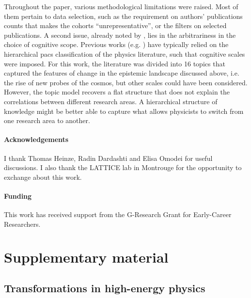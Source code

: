 \documentclass{article}
\begin{document}
Throughout the paper, various methodological limitations were raised. Most of them pertain to data selection, such as the requirement on authors' publications counts that makes the cohorts ``unrepresentative'', or the filters on selected publications. A second issue, already noted by \citet{Gieryn1978}, lies in the arbitrariness in the choice of cognitive scope. Previous works (e.g. \citealt{Tripodi2020,Aleta2019,Battiston2019,Jia2017}) have typically relied on the hierarchical \gls{pacs} classification of the physics literature, such that cognitive scales were imposed. For this work, the literature was divided into 16 topics that captured the features of change in the epistemic landscape discussed above, i.e. the rise of new probes of the cosmos, but other scales could have been considered. However, the topic model recovers a flat structure that does not explain the correlations between different research areas. A hierarchical structure of knowledge might be better able to capture what allows physicists to switch from one research area to another. %


\paragraph{Acknowledgements}{I thank Thomas Heinze, Radin Dardashti and Elisa Omodei for useful discussions. I also thank the LATTICE lab in Montrouge for the opportunity to exchange about this work.}

\paragraph{Funding}{This work has received support from the G-Research Grant for Early-Career Researchers.}

\printbibliography

\newpage

\appendix

\section{Supplementary material}

\subsection{\label{appendix:landscape}Transformations in high-energy physics}
\end{document}
